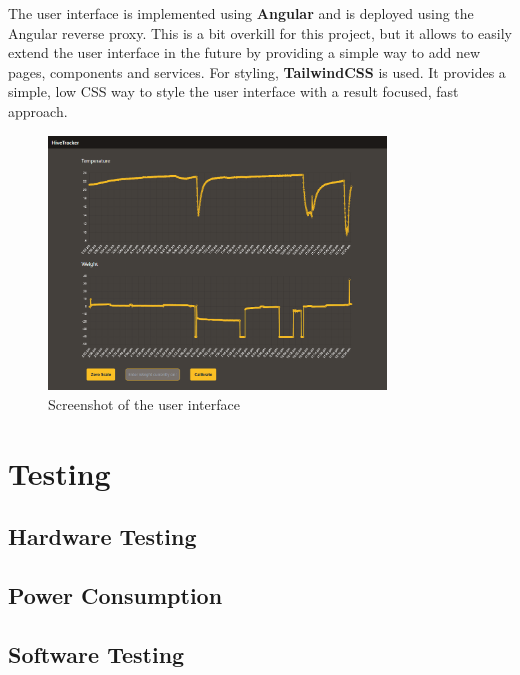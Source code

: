 The user interface is implemented using \textbf{Angular} and is deployed using the Angular reverse proxy. This is a bit overkill for this project, but it allows to easily extend the user interface in the future by providing a simple way to add new pages, components and services. For styling, \textbf{TailwindCSS} is used. It provides a simple, low CSS way to style the user interface with a result focused, fast approach.

\begin{figure}
    \centering
    \includegraphics[width=0.8\textwidth]{figures/user_interface.png}
    \caption{Screenshot of the user interface}
    \label{fig:user_interface}
\end{figure}

\newpage
\section{Testing}
\subsection{Hardware Testing}
\subsection{Power Consumption}
\subsection{Software Testing}